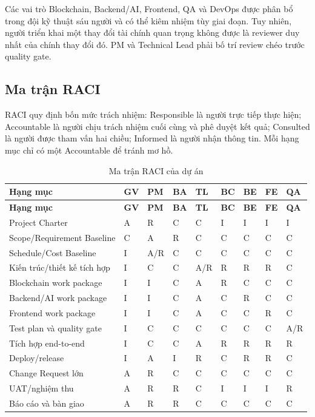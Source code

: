 Các vai trò Blockchain, Backend/AI, Frontend, QA và DevOps được phân bổ trong đội kỹ thuật sáu người và có thể kiêm nhiệm tùy giai đoạn. Tuy nhiên, người triển khai một thay đổi tài chính quan trọng không được là reviewer duy nhất của chính thay đổi đó. PM và Technical Lead phải bố trí review chéo trước quality gate.

\fi
\subsection{Ma trận RACI}

RACI quy định bốn mức trách nhiệm: Responsible là người trực tiếp thực hiện; Accountable là người chịu trách nhiệm cuối cùng và phê duyệt kết quả; Consulted là người được tham vấn hai chiều; Informed là người nhận thông tin. Mỗi hạng mục chỉ có một Accountable để tránh mơ hồ.

\begin{landscape}
\begin{longtable}{| p{4.3cm} | p{1.5cm} | p{1.5cm} | p{1.5cm} | p{1.5cm} | p{1.5cm} | p{1.5cm} | p{1.5cm} | p{1.5cm} |}
\caption{Ma trận RACI của dự án}\label{tab:raci}\\
\hline
\textbf{Hạng mục} & \textbf{GV} & \textbf{PM} & \textbf{BA} & \textbf{TL} & \textbf{BC} & \textbf{BE} & \textbf{FE} & \textbf{QA} \\
\hline
\endfirsthead
\hline
\textbf{Hạng mục} & \textbf{GV} & \textbf{PM} & \textbf{BA} & \textbf{TL} & \textbf{BC} & \textbf{BE} & \textbf{FE} & \textbf{QA} \\
\hline
\endhead
Project Charter & A & R & C & C & I & I & I & I \\ \hline
Scope/Requirement Baseline & C & A & R & C & C & C & C & C \\ \hline
Schedule/Cost Baseline & I & A/R & C & C & C & C & C & C \\ \hline
Kiến trúc/thiết kế tích hợp & I & C & C & A/R & R & R & R & C \\ \hline
Blockchain work package & I & I & C & A & R & C & C & C \\ \hline
Backend/AI work package & I & I & C & A & C & R & C & C \\ \hline
Frontend work package & I & I & C & A & C & C & R & C \\ \hline
Test plan và quality gate & I & C & C & C & C & C & C & A/R \\ \hline
Tích hợp end-to-end & I & C & C & A & R & R & R & R \\ \hline
Deploy/release & I & A & I & R & C & R & R & C \\ \hline
Change Request lớn & A & R & C & C & C & C & C & C \\ \hline
UAT/nghiệm thu & A & R & R & C & I & I & I & R \\ \hline
Báo cáo và bàn giao & A & R & R & C & C & C & C & C \\
\hline
\end{longtable}
\end{landscape}

